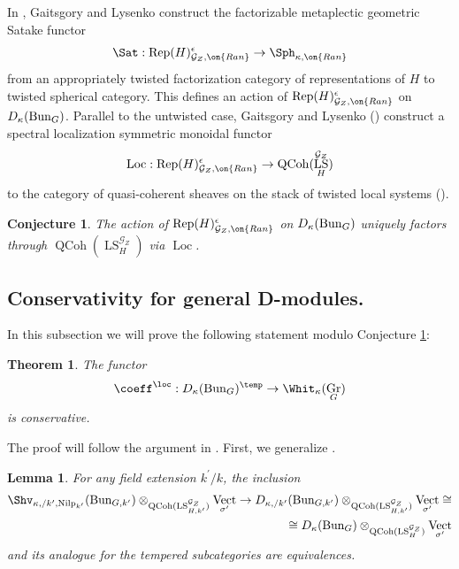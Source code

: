 \documentclass[9pt]{amsart}
\DeclareMathOperator{\Gra}{{Gr}}
\newcommand{\cG}{{\mathcal G}}
\newcommand{\Ranp}{{\on{Ran}}}
\newtheorem{thm}[subsubsection]{Theorem}
\newtheorem{conj}{Conjecture}
\DeclareMathOperator{\QCoh}{{QCoh}}
\DeclareMathOperator{\LocSys}{{LS}}
\DeclareMathOperator{\Loc}{{Loc}}
\DeclareMathOperator{\Nilp}{{Nilp}} \DeclareMathOperator{\op}{{op}}
\DeclareMathOperator{\Vect}{{Vect}}
\DeclareMathOperator{\Rep}{{Rep}}
\newtheorem{lm}[subsubsection]{Lemma}
\numberwithin{equation}{section}
\begin{document}
\subsubsection{} In \cite[9.2]{GL}, Gaitsgory and Lysenko construct the factorizable metaplectic geometric Satake functor 
\begin{equation}
	\Sat: \Rep(H)_{\cG_Z, \Ranp}^{\epsilon} \rightarrow \Sph_{\kappa, \Ranp}
\end{equation}
from an appropriately twisted factorization category of representations of $H$ to twisted spherical category. This defines an action of $\Rep(H)_{\cG_Z, \Ranp}^{\epsilon}$ on $D_{\kappa}(\operatorname{{Bun}}_G)$. Parallel to the untwisted case, Gaitsgory and Lysenko (\cite[9.6]{GL}) construct a spectral localization symmetric monoidal functor 
\begin{equation}
	\Loc: \Rep(H)_{\cG_Z, \Ranp}^{\epsilon} \rightarrow \QCoh(\LocSys_H^{\cG_Z})
\end{equation}
to the category of quasi-coherent sheaves on the stack of twisted local systems (\cite[8.4]{GL}).

\begin{conj}\label{spectral action}
	The action of $\Rep(H)_{\cG_Z, \Ranp}^{\epsilon}$ on $D_{\kappa}(\operatorname{{Bun}}_G)$ uniquely factors through $\QCoh(\LocSys_H^{\cG_Z})$ via $\Loc$.
\end{conj}


 
\subsection{Conservativity for general D-modules.}
 In this subsection we will prove the following statement modulo Conjecture \ref{spectral action}:
 
 \begin{thm}\label{general}
 	The functor 
 	$$\coeff^{\loc}: D_{\kappa}(\Bun_{G})^{\temp} \rightarrow \Whit_{\kappa}(\Gra_G)$$ is conservative.
 \end{thm}

The proof will follow the argument in \cite[10.3.3]{FR}. First, we generalize \cite[20.9.1]{AGKRRV}.

\begin{lm}\label{20.9.1}
	 For any field extension $k^\prime / k$, the inclusion
	 \begin{equation}
	 \begin{split}
	  \Shv_{\kappa, /k^{\prime}, \Nilp_{k^{\prime}}}(\Bun_{G, k^{\prime}}) \otimes_{\QCoh(\LocSys_{H, k^{\prime}}^{\cG_Z})}\Vect_{\sigma^{\prime}} \rightarrow D_{\kappa,  /k^{\prime}}(\Bun_{G,  k^{\prime}}) \otimes_{\QCoh(\LocSys_{H,  k^{\prime}}^{\cG_Z})}\Vect_{\sigma^{\prime}} \cong \\
	  \cong D_{\kappa}(\Bun_{G}) \otimes_{\QCoh(\LocSys_H^{\cG_Z})}\Vect_{\sigma^{\prime}} 
	 \end{split}
	 \end{equation}
	and its analogue for the tempered subcategories are equivalences.
\end{lm}
\end{document}
